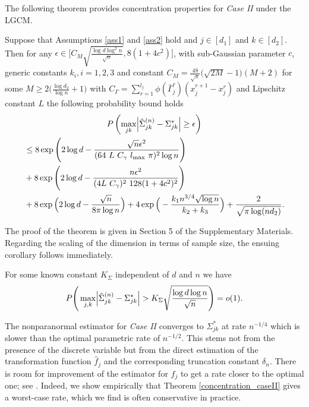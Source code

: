 \noindent The following theorem provides concentration properties for \textit{Case II} under the LGCM.
\begin{theorem}\label{concentration_caseII}
    Suppose that Assumptions \ref{ass1} and \ref{ass2} hold and $j \in [d_1]$ and $k \in [d_2]$. Then for any $\epsilon \in \Big[C_M\sqrt{\frac{\log d \log^2 n}{\sqrt{n}}},8(1+4c^2)\Big]$, with sub-Gaussian parameter $c$, generic constants $k_i, i = 1,2,3$ and constant $C_M = \frac{48}{\sqrt{\pi}} \big(\sqrt{2M} - 1\big)(M+2)$ for some $M \geq 2\big(\frac{\log d_2}{\log n} +1\big)$ with $C_\Gamma = \sum_{r=1}^{l_j} \phi(\bar{\Gamma}_j^r)(x_j^{r+1} - x_j^r)$ and Lipschitz constant $L$ the following probability bound holds
    \begin{multline*}
        P\left(\max_{jk}\abs{\hat{\Sigma}_{jk}^{(n)} -  \Sigma_{jk}^{*}} \geq \epsilon \right) \\
        \begin{aligned}
             & \leq 8\exp\Bigg(2\log d - \frac{\sqrt{n}\epsilon^2}{(64 \ L \ C_\gamma \ l_{\max} \ \pi)^2 \log n}\Bigg)                                                 \\
             & + 8\exp\left( 2\log d - \frac{n \epsilon^2}{(4L \ C_\gamma)^2 \ 128(1+4c^2)^2} \right)                                                                   \\
             & + 8\exp\Big(2\log d - \frac{\sqrt{n}}{8\pi\log n}\Big) + 4\exp\Big(- \frac{k_1 n^{3/4} \sqrt{\log n}}{k_2+ k_3} \Big) + \frac{2}{\sqrt{\pi \log(nd_2)}}.
        \end{aligned}
    \end{multline*}

\end{theorem}
The proof of the theorem is given in Section 5
of the Supplementary Materials. Regarding the scaling of the dimension in terms of sample size, the ensuing corollary follows immediately.
\begin{corollary}
    For some known constant $K_{\Sigma}$ independent of $d$ and $n$ we have
    \begin{equation}
        P\Bigg(\max_{j,k}\abs{\hat{\Sigma}_{jk}^{(n)} - \Sigma_{jk}^*} > K_{\Sigma}\sqrt{\frac{\log d \log n}{\sqrt{n}}} \Bigg) = o(1).
    \end{equation}
\end{corollary}

The nonparanormal estimator for \textit{Case II} converges to \(\Sigma_{jk}^*\) at rate \(n^{-1/4}\) which is slower than the optimal parametric rate of \(n^{-1/2}\). This stems not from the presence of the discrete variable but from the direct estimation of the transformation function \(\hat{f}_j\) and the corresponding truncation constant \(\delta_n\). There is room for improvement of the estimator for \(f_j\) to get a rate closer to the optimal one; see \citep{Xue12}. Indeed, we show empirically that Theorem \ref{concentration_caseII} gives a worst-case rate, which we find is often conservative in practice.


